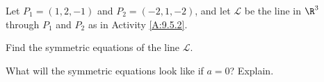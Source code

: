 \begin{activity} \label{A:9.5.4}  	Let $P_1 = (1,2,-1)$ and $P_2 = (-2,1,-2)$, and let $\mathcal{L}$ be the line in $\R^3$ through $P_1$ and $P_2$ as in Activity \ref{A:9.5.2}.
	\ba
	\item Find the symmetric equations of the line $\mathcal{L}$.
	
	
	
	\item What will the symmetric equations look like if $a=0$? Explain.
	
	
	
	\ea


\end{activity}
\begin{smallhint}

\end{smallhint}
\begin{bighint}

\end{bighint}
\begin{activitySolution}

\end{activitySolution}
\aftera
